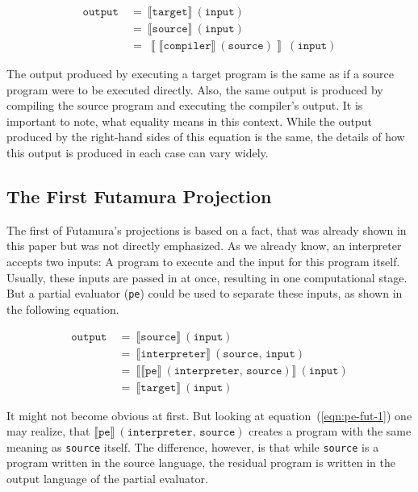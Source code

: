 \begin{align}
  \mathtt{output}\
  &=\ \llbracket \mathtt{target} \rrbracket\ (\mathtt{input}) \\
  &=\ \llbracket \mathtt{source} \rrbracket\ (\mathtt{input}) \\
  &=\ \left\llbracket \llbracket \mathtt{compiler} \rrbracket\ (\mathtt{source}) \right\rrbracket\ (\mathtt{input})
\end{align}

The output produced by executing a target program is the same as if a source program were to be executed directly.
Also, the same output is produced by compiling the source program and executing the compiler's output.
It is important to note, what equality means in this context.
While the output produced by the right-hand sides of this equation is the same, the details of how this output is produced in each case can vary widely.


\subsection{The First Futamura Projection}\label{sec:futamura-first}

The first of Futamura's projections is based on a fact, that was already shown in this paper but was not directly emphasized.
As we already know, an interpreter accepts two inputs: A program to execute and the input for this program itself.
Usually, these inputs are passed in at once, resulting in one computational stage.
But a partial evaluator (\texttt{pe}) could be used to separate these inputs, as shown in the following equation.

\begin{align}
  \mathtt{output}\
  &=\ \llbracket \mathtt{source} \rrbracket \ (\mathtt{input}) \\
  &=\ \llbracket \mathtt{interpreter} \rrbracket \ (\mathtt{source},\, \mathtt{input}) \\
  &=\ \llbracket \llbracket \mathtt{pe} \rrbracket \ (\mathtt{interpreter},\, \mathtt{source}) \rrbracket \ (\mathtt{input}) \label{eqn:pe-fut-1} \\
  &=\ \llbracket \mathtt{target} \rrbracket \ (\mathtt{input})
\end{align}

It might not become obvious at first.
But looking at equation~(\ref{eqn:pe-fut-1}) one may realize, that $\llbracket \mathtt{pe} \rrbracket \ (\mathtt{interpreter},\, \mathtt{source})$ creates a program with the same meaning as \texttt{source} itself.
The difference, however, is that while \texttt{source} is a program written in the source language, the residual program is written in the output language of the partial evaluator.


